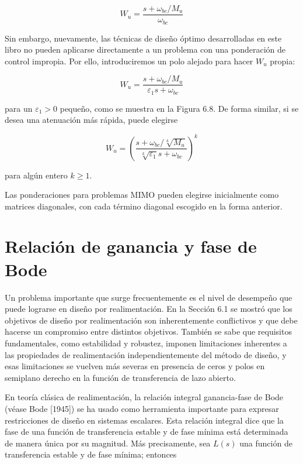 \begin{equation*}
W_{u}=\frac{s+\omega_{b c} / M_{u}}{\omega_{b c}} \tag{6.8}
\end{equation*}



Sin embargo, nuevamente, las técnicas de diseño óptimo desarrolladas en este libro no pueden aplicarse directamente a un problema con una ponderación de control impropia. Por ello, introduciremos un polo alejado para hacer $W_{u}$ propia:


\begin{equation*}
W_{u}=\frac{s+\omega_{b c} / M_{u}}{\varepsilon_{1} s+\omega_{b c}} \tag{6.9}
\end{equation*}


para un $\varepsilon_{1}>0$ pequeño, como se muestra en la Figura 6.8. De forma similar, si se desea una atenuación más rápida, puede elegirse


\begin{equation*}
W_{u}=\left(\frac{s+\omega_{b c} / \sqrt[k]{M_{u}}}{\sqrt[k]{\varepsilon_{1}} s+\omega_{b c}}\right)^{k} \tag{6.10}
\end{equation*}


para algún entero $k \geq 1$.

Las ponderaciones para problemas MIMO pueden elegirse inicialmente como matrices diagonales, con cada término diagonal escogido en la forma anterior.

\section{Relación de ganancia y fase de Bode}
Un problema importante que surge frecuentemente es el nivel de desempeño que puede lograrse en diseño por realimentación. En la Sección 6.1 se mostró que los objetivos de diseño por realimentación son inherentemente conflictivos y que debe hacerse un compromiso entre distintos objetivos. También se sabe que requisitos fundamentales, como estabilidad y robustez, imponen limitaciones inherentes a las propiedades de realimentación independientemente del método de diseño, y esas limitaciones se vuelven más severas en presencia de ceros y polos en semiplano derecho en la función de transferencia de lazo abierto.

En teoría clásica de realimentación, la relación integral ganancia-fase de Bode (véase Bode [1945]) se ha usado como herramienta importante para expresar restricciones de diseño en sistemas escalares. Esta relación integral dice que la fase de una función de transferencia estable y de fase mínima está determinada de manera única por su magnitud. Más precisamente, sea $L(s)$ una función de transferencia estable y de fase mínima; entonces


